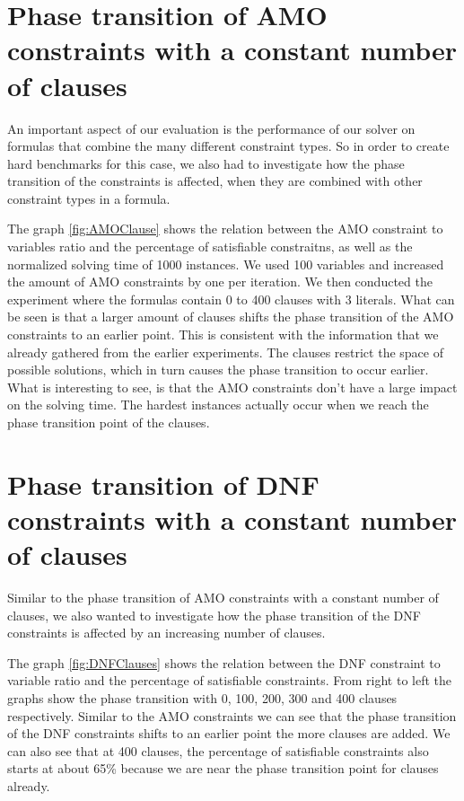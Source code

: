 \section{Phase transition of AMO constraints with a constant number of clauses}

An important aspect of our evaluation is the performance of our solver on formulas that combine the many different constraint types. So in order to create hard benchmarks for this case, we also had to investigate how the phase transition of the constraints is affected, when they are combined with other constraint types in a formula.

	

The graph \ref{fig:AMOClause} shows the relation between the AMO constraint to variables ratio and the percentage of satisfiable constraitns, as well as the normalized solving time of 1000 instances. We used 100 variables and increased the amount of AMO constraints by one per iteration. We then conducted the experiment where the formulas contain 0 to 400 clauses with 3 literals. What can be seen is that a larger amount of clauses shifts the phase transition of the AMO constraints to an earlier point. This is consistent with the information that we already gathered from the earlier experiments. The clauses restrict the space of possible solutions, which in turn causes the phase transition to occur earlier. What is interesting to see, is that the AMO constraints don't have a large impact on the solving time. The hardest instances actually occur when we reach the phase transition point of the clauses.

\section{Phase transition of DNF constraints with a constant number of clauses}

Similar to the phase transition of AMO constraints with a constant number of clauses, we also wanted to investigate how the phase transition of the DNF constraints is affected by an increasing number of clauses.

	

The graph \ref{fig:DNFClauses} shows the relation between the DNF constraint to variable ratio and the percentage of satisfiable constraints. From right to left the graphs show the phase transition with 0, 100, 200, 300 and 400 clauses respectively. Similar to the AMO constraints we can see that the phase transition of the DNF constraints shifts to an earlier point the more clauses are added. We can also see that at 400 clauses, the percentage of satisfiable constraints also starts at about 65\% because we are near the phase transition point for clauses already.

